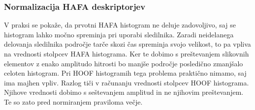 \subsubsection{Normalizacija HAFA deskriptorjev}
V praksi se pokaže, da prvotni HAFA histogram ne deluje zadovoljivo, saj se histogram lahko močno spreminja pri uporabi sledilnika. Zaradi neidelanega delovanja sledilnika področje tarče skozi čas spreminja svojo velikost, to pa vpliva na vrednosti stolpcev HAFA histograma. Ker te dobimo s preštevanjem slikovnih elementov z enako amplitudo hitrosti bo manjše področje posledično zmanjšalo celoten histogram. Pri HOOF histogramih tega problema praktično nimamo, saj ima majhen vpliv. Razlog tiči v računanju vrednosti stolpcev HOOF histograma. Njihove vrednosti dobimo s seštevanjem amplitud in ne njihovim preštevanjem. Te so zato pred normiranjem praviloma večje.

